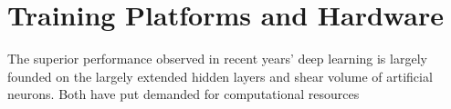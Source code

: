 \section{Training Platforms and Hardware}
The superior performance observed in recent years' deep learning is largely founded on the largely extended hidden layers and shear volume of artificial neurons. Both have put demanded for  computational resources 